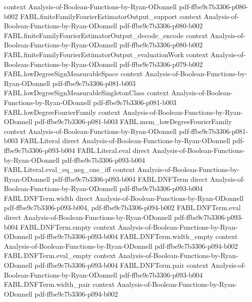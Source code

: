 \begin{theorem}
  {context}
  {Analysis-of-Boolean-Functions-by-Ryan-ODonnell}
  {pdf-ffbe9c7b3306-p080-b002}
\proofstep
  {FABL.finiteFamilyFourierEstimatorOutput_support}
  {context}
  {Analysis-of-Boolean-Functions-by-Ryan-ODonnell}
  {pdf-ffbe9c7b3306-p080-b002}
\proofstep
  {FABL.finiteFamilyFourierEstimatorOutput_decode_encode}
  {context}
  {Analysis-of-Boolean-Functions-by-Ryan-ODonnell}
  {pdf-ffbe9c7b3306-p080-b002}
\proofstep
  {FABL.finiteFamilyFourierEstimatorOutput_evaluationWork}
  {context}
  {Analysis-of-Boolean-Functions-by-Ryan-ODonnell}
  {pdf-ffbe9c7b3306-p079-b002}
\proofstep
  {FABL.lowDegreeSignMeasurableSpace}
  {context}
  {Analysis-of-Boolean-Functions-by-Ryan-ODonnell}
  {pdf-ffbe9c7b3306-p081-b003}
\proofstep
  {FABL.lowDegreeSignMeasurableSingletonClass}
  {context}
  {Analysis-of-Boolean-Functions-by-Ryan-ODonnell}
  {pdf-ffbe9c7b3306-p081-b003}
\proofstep
  {FABL.lowDegreeFourierFamily}
  {context}
  {Analysis-of-Boolean-Functions-by-Ryan-ODonnell}
  {pdf-ffbe9c7b3306-p081-b003}
\proofstep
  {FABL.mem_lowDegreeFourierFamily}
  {context}
  {Analysis-of-Boolean-Functions-by-Ryan-ODonnell}
  {pdf-ffbe9c7b3306-p081-b003}
\proofstep
  {FABL.Literal}
  {direct}
  {Analysis-of-Boolean-Functions-by-Ryan-ODonnell}
  {pdf-ffbe9c7b3306-p093-b004}
\proofstep
  {FABL.Literal.eval}
  {direct}
  {Analysis-of-Boolean-Functions-by-Ryan-ODonnell}
  {pdf-ffbe9c7b3306-p093-b004}
\proofstep
  {FABL.Literal.eval_eq_neg_one_iff}
  {context}
  {Analysis-of-Boolean-Functions-by-Ryan-ODonnell}
  {pdf-ffbe9c7b3306-p093-b004}
\proofstep
  {FABL.DNFTerm}
  {direct}
  {Analysis-of-Boolean-Functions-by-Ryan-ODonnell}
  {pdf-ffbe9c7b3306-p093-b004}
\proofstep
  {FABL.DNFTerm.width}
  {direct}
  {Analysis-of-Boolean-Functions-by-Ryan-ODonnell}
  {pdf-ffbe9c7b3306-p093-b004,
    pdf-ffbe9c7b3306-p094-b002}
\proofstep
  {FABL.DNFTerm.eval}
  {direct}
  {Analysis-of-Boolean-Functions-by-Ryan-ODonnell}
  {pdf-ffbe9c7b3306-p093-b004}
\proofstep
  {FABL.DNFTerm.empty}
  {context}
  {Analysis-of-Boolean-Functions-by-Ryan-ODonnell}
  {pdf-ffbe9c7b3306-p093-b004}
\proofstep
  {FABL.DNFTerm.width_empty}
  {context}
  {Analysis-of-Boolean-Functions-by-Ryan-ODonnell}
  {pdf-ffbe9c7b3306-p094-b002}
\proofstep
  {FABL.DNFTerm.eval_empty}
  {context}
  {Analysis-of-Boolean-Functions-by-Ryan-ODonnell}
  {pdf-ffbe9c7b3306-p093-b004}
\proofstep
  {FABL.DNFTerm.pair}
  {context}
  {Analysis-of-Boolean-Functions-by-Ryan-ODonnell}
  {pdf-ffbe9c7b3306-p093-b004}
\proofstep
  {FABL.DNFTerm.width_pair}
  {context}
  {Analysis-of-Boolean-Functions-by-Ryan-ODonnell}
  {pdf-ffbe9c7b3306-p094-b002}

\end{theorem}
